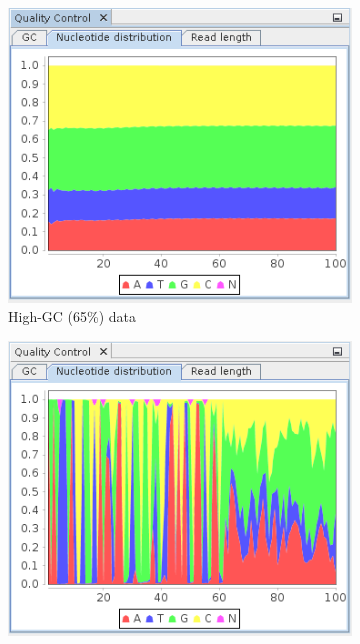 \begin{figure}[H]
        \centering
        \begin{subfigure}[b]{0.3\textwidth}
                \includegraphics[width=\textwidth]{img/mgx/highGCnucl}
                \caption{High-GC (65\%) data}
        \end{subfigure}%
        \begin{subfigure}[b]{0.3\textwidth}
                \includegraphics[width=\textwidth]{img/mgx/ampliconNucl}

\end{subfigure}
\end{figure}
